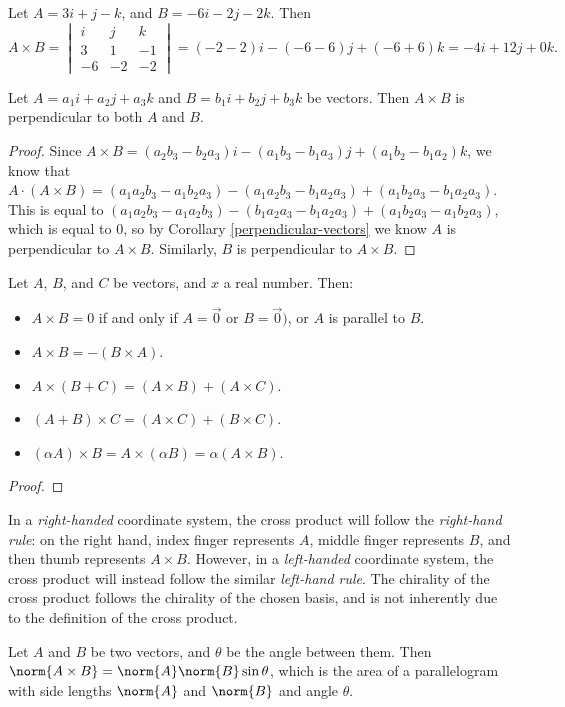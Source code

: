 \documentclass[12pt]{article}
\begin{document}
\begin{exmp}
    Let $A = 3i + j - k$, and $B = -6i - 2j - 2k$. Then \[A \times B =
    \begin{vmatrix}
        i & j & k \\ 3 & 1 & -1 \\ -6 & -2 & -2
    \end{vmatrix} = (-2 - 2)i - (-6 - 6)j + (-6 + 6)k = -4i + 12j + 0k.\]
\end{exmp}

\begin{thm}
    Let $A = a_1i + a_2j + a_3k$ and $B = b_1i + b_2j + b_3k$ be vectors. Then $A \times B$ is perpendicular to both $A$ and $B$.
\end{thm}

\begin{proof}
    Since $A \times B = (a_2b_3 - b_2a_3)i - (a_1b_3 - b_1a_3)j + (a_1b_2 - b_1a_2)k$, we know that $A \cdot (A \times B) = (a_1a_2b_3 - a_1b_2a_3) - (a_1a_2b_3 - b_1a_2a_3) + (a_1b_2a_3 - b_1a_2a_3)$. This is equal to $(a_1a_2b_3 - a_1a_2b_3) - (b_1a_2a_3 - b_1a_2a_3) + (a_1b_2a_3 - a_1b_2a_3)$, which is equal to $0$, so by Corollary \ref{perpendicular-vectors} we know $A$ is perpendicular to $A \times B$. Similarly, $B$ is perpendicular to $A \times B$.
\end{proof}

\begin{thm}
    Let $A$, $B$, and $C$ be vectors, and $x$ a real number. Then:
    \begin{itemize}
        \item $A \times B = 0$ if and only if $A = \vec{0}$ or $B = \vec{0})$, or $A$ is parallel to $B$.
        \item $A \times B = -(B \times A)$.
        \item $A \times (B + C) = (A \times B) + (A \times C)$.
        \item $(A + B) \times C = (A \times C) + (B \times C)$.
        \item $(\alpha A) \times B = A \times (\alpha B) = \alpha(A \times B)$.
    \end{itemize}
\end{thm}

\begin{proof}
    
\end{proof}

\begin{rmk}
    In a \emph{right-handed} coordinate system, the cross product will follow the \emph{right-hand rule}: on the right hand, index finger represents $A$, middle finger represents $B$, and then thumb represents $A \times B$. However, in a \emph{left-handed} coordinate system, the cross product will instead follow the similar \emph{left-hand rule}. The chirality of the cross product follows the chirality of the chosen basis, and is not inherently due to the definition of the cross product.
\end{rmk}

\begin{thm}
    Let $A$ and $B$ be two vectors, and $\theta$ be the angle between them. Then $\norm{A \times B} = \norm{A}\norm{B}\sin\theta$, which is the area of a parallelogram with side lengths $\norm{A}$ and $\norm{B}$ and angle $\theta$.
\end{thm}
\end{document}
